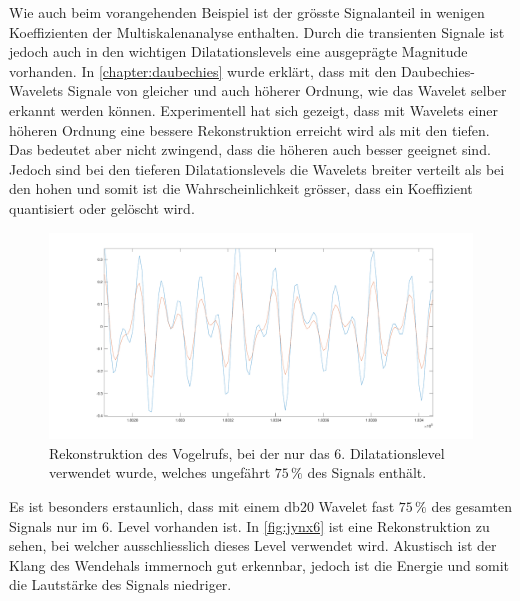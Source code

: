 \begin{refsection}
Wie auch beim vorangehenden Beispiel ist der grösste Signalanteil in wenigen Koeffizienten der Multiskalenanalyse enthalten.
Durch die transienten Signale ist jedoch auch in den wichtigen Dilatationslevels eine ausgeprägte Magnitude vorhanden.
In \autoref{chapter:daubechies} wurde erklärt, dass mit den Daubechies-Wavelets Signale von gleicher und auch höherer Ordnung, wie das Wavelet selber erkannt werden können. 
Experimentell hat sich gezeigt, dass mit Wavelets einer höheren Ordnung eine bessere Rekonstruktion erreicht wird als mit den tiefen.
Das bedeutet aber nicht zwingend, dass die höheren auch besser geeignet sind.
Jedoch sind bei den tieferen Dilatationslevels die Wavelets breiter verteilt als bei den hohen und somit ist die Wahrscheinlichkeit grösser, dass ein Koeffizient quantisiert oder gelöscht wird. 
\begin{figure}
	\centering
	\includegraphics[width=\linewidth]{papers/compress/Bilder/jynxNear.pdf}
	\caption{Rekonstruktion des Vogelrufs, bei der nur das 6. Dilatationslevel verwendet wurde, welches ungefährt $75\,\textbf{\%}$ des Signals enthält.}
	\label{fig:jynx6}
\end{figure}
Es ist besonders erstaunlich, dass mit einem db20 Wavelet fast $75\,\text{\%}$ des gesamten Signals nur im 6. Level vorhanden ist.
In \autoref{fig:jynx6} ist eine Rekonstruktion zu sehen, bei welcher ausschliesslich dieses Level verwendet wird.
Akustisch ist der Klang des Wendehals immernoch gut erkennbar, jedoch ist die Energie und somit die Lautstärke des Signals niedriger.


\end{refsection}

